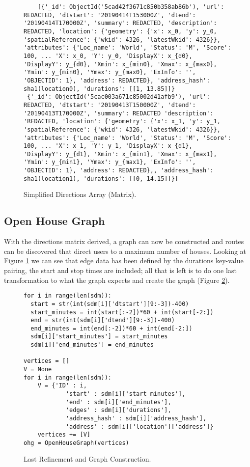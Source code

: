 \documentclass[letterpaper,11pt]{report}
\theoremstyle{definition}
\theoremstyle{definition}
\begin{document}
\begin{figure}[!htb]
  \begin{lstlisting}
    [{'_id': ObjectId('5cad42f3671c850b358ab86b'), 'url': REDACTED, 'dtstart': '20190414T153000Z', 'dtend': '20190414T170000Z', 'summary': REDACTED, 'description': REDACTED, 'location': {'geometry': {'x': x_0, 'y': y_0, 'spatialReference': {'wkid': 4326, 'latestWkid': 4326}}, 'attributes': {'Loc_name': 'World', 'Status': 'M', 'Score': 100, ... 'X': x_0, 'Y': y_0, 'DisplayX': x_{d0}, 'DisplayY': y_{d0}, 'Xmin': x_{min0}, 'Xmax': x_{max0}, 'Ymin': y_{min0}, 'Ymax': y_{max0}, 'ExInfo': '', 'OBJECTID': 1}, 'address': REDACTED}, 'address_hash': sha1(location0), 'durations': [[1, 13.85]]}
 {'_id': ObjectId('5cac003a671c85002d41afb9'), 'url': REDACTED, 'dtstart': '20190413T150000Z', 'dtend': '20190413T170000Z', 'summary': REDACTED 'description': 'REDACTED, 'location': {'geometry': {'x': x_1, 'y': y_1, 'spatialReference': {'wkid': 4326, 'latestWkid': 4326}}, 'attributes': {'Loc_name': 'World', 'Status': 'M', 'Score': 100, ... 'X': x_1, 'Y': y_1, 'DisplayX': x_{d1}, 'DisplayY': y_{d1}, 'Xmin': x_{min1}, 'Xmax': x_{max1}, 'Ymin': y_{min1}, 'Ymax': y_{max1}, 'ExInfo': '', 'OBJECTID': 1}, 'address': REDACTED},, 'address_hash': sha1(location1), 'durations': [[0, 14.15]]}]
  \end{lstlisting}
  \caption{Simplified Directions Array (Matrix).}\label{simplified directions array}
\end{figure}

 \subsection{Open House Graph}
 With the directions matrix derived, a graph can now be constructed and routes can be discovered that direct users to a maximum number of houses. Looking at Figure \ref{simplified directions array} we can see that edge data has been defined by the \textsf{durations} key-value pairing, the start and stop times are included; all that is left is to do one last transformation to what the graph expects and create the graph (Figure \ref{last refinement}).
 \begin{figure}[!htb]
   \begin{lstlisting}
for i in range(len(sdm)):
  start = str(int(sdm[i]['dtstart'][9:-3])-400)
  start_minutes = int(start[:-2])*60 + int(start[-2:])
  end = str(int(sdm[i]['dtend'][9:-3])-400)
  end_minutes = int(end[:-2])*60 + int(end[-2:])
  sdm[i]['start_minutes'] = start_minutes
  sdm[i]['end_minutes'] = end_minutes

vertices = []
V = None
for i in range(len(sdm)):
    V = {'ID' : i, 
            'start' : sdm[i]['start_minutes'], 
            'end' : sdm[i]['end_minutes'], 
            'edges' : sdm[i]['durations'],
            'address_hash' : sdm[i]['address_hash'],
            'address' : sdm[i]['location']['address']}
    vertices += [V]
ohg = OpenHouseGraph(vertices)
   \end{lstlisting}
   \caption{Last Refinement and Graph Construction.}\label{last refinement}
  \end{figure}
\end{document}
